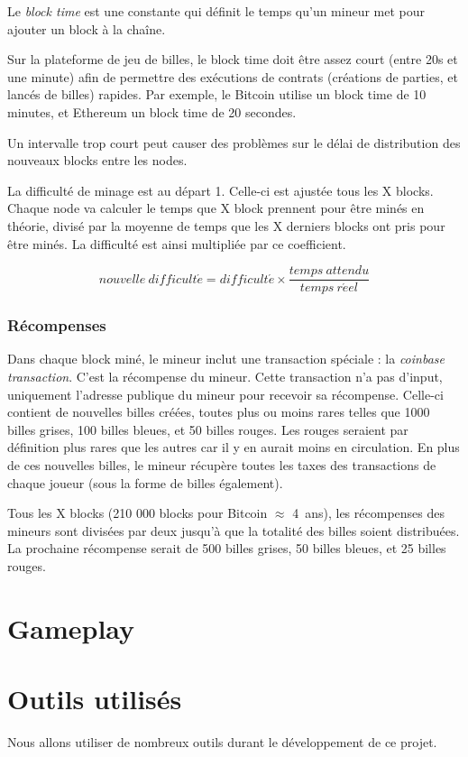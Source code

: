 \documentclass{article}
\begin{document}
Le \textit{block time} est une constante qui définit le temps qu’un mineur met pour ajouter un block à la chaîne.

Sur la plateforme de jeu de billes, le block time doit être assez court (entre 20s et une minute) afin de permettre des exécutions de contrats (créations de parties, et lancés de billes) rapides. Par exemple, le Bitcoin utilise un block time de 10 minutes, et Ethereum un block time de 20 secondes.

Un intervalle trop court peut causer des problèmes sur le délai de distribution des nouveaux blocks entre les nodes.

La difficulté de minage est au départ 1. Celle-ci est ajustée tous les X
blocks. Chaque node va calculer le temps que X block prennent pour être minés en théorie, divisé par la moyenne de temps que les X derniers blocks ont pris pour être minés. La difficulté est ainsi multipliée par ce coefficient.

\[ nouvelle\ difficult\acute{e} = difficult\acute{e} \times \frac{temps\ attendu}{temps\ r\acute{e}el} \]

\subsubsection{Récompenses}
Dans chaque block miné, le mineur inclut une transaction spéciale : la \textit{coinbase transaction}. C'est la récompense du mineur.
Cette transaction n'a pas d'input, uniquement l'adresse publique du mineur pour recevoir sa récompense.
Celle-ci contient de nouvelles billes créées, toutes plus ou moins rares telles que 1000 billes grises, 100 billes bleues, et 50 billes rouges. Les rouges seraient par définition plus rares que les autres car il y en aurait moins en circulation.
En plus de ces nouvelles billes, le mineur récupère toutes les taxes des transactions de chaque joueur (sous la forme de billes également).

Tous les X blocks (210 000 blocks pour Bitcoin $\approx$ 4\ ans), les récompenses des mineurs sont divisées par deux jusqu'à que la totalité des billes soient distribuées.
La prochaine récompense serait de 500 billes grises, 50 billes bleues, et 25 billes rouges.

\section{Gameplay}




\section{Outils utilisés}
Nous allons utiliser de nombreux outils durant le développement de ce projet.
\end{document}
